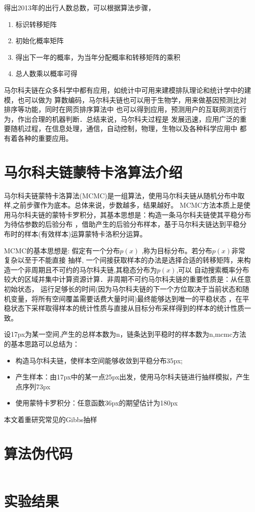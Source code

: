     得出2013年的出行人数总数，可以根据算法步骤，
    \begin{enumerate}
    \item 标识转移矩阵
    \item 初始化概率矩阵
    \item 得出下一年的概率，为当年分配概率和转移矩阵的乘积
    \item 总人数乘以概率可得
    \end{enumerate}

    马尔科夫链在众多科学中都有应用，如统计中可用来建模排队理论和统计学中的建模，也可以做为
算数编码，马尔科夫链也可以用于生物学，用来做基因预测比对排序等功能，同时在网页排序算法中
也可以得到应用，预测用户的互联网浏览行为，作出合理的机器判断．总结来说，马尔科夫过程是
发展迅速，应用广泛的重要随机过程，在信息处理，通信，自动控制，物理，生物以及各种科学应用中
都有着各种的重要应用。

\section{马尔科夫链蒙特卡洛算法介绍}

    马尔科夫链蒙特卡洛算法(MCMC)是一组算法，使用马尔科夫链从随机分布中取样,之前步骤作为底本。总体来说，步数越多，结果越好。
MCMC方法本质上是使用马尔科夫链的蒙特卡罗积分，其基本思想是：构造一条马尔科夫链使其平稳分布为待估参数的后验分布
，借助产生的后验分布样本，基于马尔科夫链达到平稳分布时的样本(有效样本)运算蒙特卡洛积分运算。

MCMC的基本思想是: 假定有一个分布$p(x)$ ,称为目标分布。若分布$p(x)$非常复杂以至于不能直接
抽样, 一个间接获取样本的办法是选择合适的转移矩阵，来构造一个非周期且不可约的马尔科夫链,其稳态分布为$p(x)$,可以
自动搜索概率分布较大的区域并集中计算资源计算．非周期不可约马尔科夫链的重要性质是：从任意初始状态，
运行足够长的时间(因为马尔科夫链的下一个方位取决于当前状态和随机变量，将所有空间覆盖需要话费大量时间)最终能够达到唯一的平稳状态
，在平稳状态下采样取得样本的统计性质与直接从目标分布采样得到的样本的统计性质一致。


设17px为某一空间,产生的总样本数为n，链条达到平稳时的样本数为n,mcmc方法的基本思路可以总结为：
    \begin{itemize}
    \item 构造马尔科夫链，使样本空间能够收敛到平稳分布35px;
    \item 产生样本：由17px中的某一点25px出发，使用马尔科夫链进行抽样模拟，产生点序列73px
    \item 使用蒙特卡罗积分：任意函数36px的期望估计为180px 
    \end{itemize}

    本文着重研究常见的Gibbs抽样
\section{算法伪代码}
\begin{verbatim}

\end{verbatim}
\section{实验结果}
